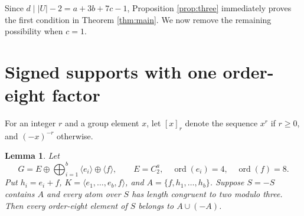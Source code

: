 \documentclass[11pt]{article}
\newtheorem{lemma}[theorem]{Lemma}
\theoremstyle{definition}
\newcommand{\ord}{\operatorname{ord}}
\begin{document}
Since $d\mid |U|-2=a+3b+7c-1$, Proposition \ref{prop:three} immediately proves the first condition in Theorem \ref{thm:main}. We now remove the remaining possibility when $c=1$.

\section{Signed supports with one order-eight factor}

For an integer $r$ and a group element $x$, let $[x]_r$ denote the sequence $x^r$ if $r\geq0$, and $(-x)^{-r}$ otherwise.

\begin{lemma}\label{lem:signed}
Let
\[
 G=E\oplus\bigoplus_{i=1}^b\langle e_i\rangle\oplus\langle f\rangle,
 \qquad E=C_2^a,\quad\ord(e_i)=4,\quad\ord(f)=8.
\]
Put $h_i=e_i+f$, $K=\langle e_1,\ldots,e_b,f\rangle$, and $A=\{f,h_1,\ldots,h_b\}$.
Suppose $S=-S$ contains $A$ and every atom over $S$ has length congruent to two modulo three. Then every order-eight element of $S$ belongs to $A\cup(-A)$.
\end{lemma}
\end{document}
